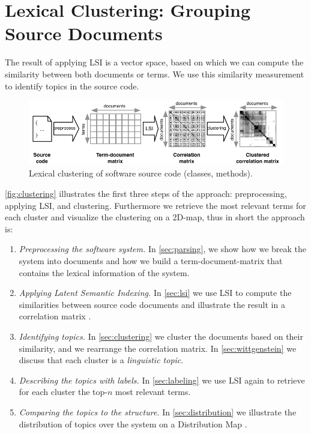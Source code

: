 \section{Lexical Clustering: Grouping Source Documents}\label{sec:sekla}

The result of applying LSI is a vector space, based on which we can compute the similarity between both documents or terms. We use this similarity measurement to identify topics in the source code.

\begin{figure}[htb]
\begin{center}
\includegraphics[width=.8\columnwidth]{fig/hapax-clustering}
\caption{Lexical clustering of software source code (\eg classes, methods).}
\label{fig:clustering}
\end{center}
\end{figure}

\autoref{fig:clustering} illustrates the first three steps of the approach: preprocessing, applying LSI, and clustering. Furthermore we retrieve the most relevant terms for each cluster and visualize the clustering on a 2D-map, thus in short the approach is:

\begin{enumerate}
  \item \emph{Preprocessing the software system.} In \autoref{sec:parsing}, we show how we break the system into documents and how we build a term-document-matrix that contains the lexical information of the system.
  \item \emph{Applying Latent Semantic Indexing.} In \autoref{sec:lsi} we use LSI to compute the similarities between source code documents and illustrate the result in a correlation matrix \cite{Ling73a}.
  \item \emph{Identifying topics.} In \autoref{sec:clustering} we cluster the documents based on their similarity, and we rearrange the correlation matrix. In \autoref{sec:wittgenstein} we discuss that each cluster is a \emph{linguistic topic}.
  \item \emph{Describing the topics with labels.} In \autoref{sec:labeling} we use LSI again to retrieve for each cluster the top-$n$ most relevant terms.
  \item \emph{Comparing the topics to the structure.} In \autoref{sec:distribution} we illustrate the distribution of topics over the system on a Distribution Map \cite{Duca06c}.
\end{enumerate}

